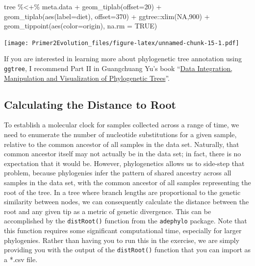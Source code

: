\documentclass[
]{book}
\newenvironment{Shaded}{\begin{snugshade}}{\end{snugshade}}
\newcommand{\AttributeTok}[1]{\textcolor[rgb]{0.77,0.63,0.00}{#1}}
\newcommand{\ConstantTok}[1]{\textcolor[rgb]{0.00,0.00,0.00}{#1}}
\newcommand{\DecValTok}[1]{\textcolor[rgb]{0.00,0.00,0.81}{#1}}
\newcommand{\FunctionTok}[1]{\textcolor[rgb]{0.00,0.00,0.00}{#1}}
\newcommand{\NormalTok}[1]{#1}
\newcommand{\SpecialCharTok}[1]{\textcolor[rgb]{0.00,0.00,0.00}{#1}}
\begin{document}
\begin{Shaded}
\begin{Highlighting}[]
\NormalTok{tree  }\SpecialCharTok{\%\textless{}+\%}\NormalTok{ meta.data }\SpecialCharTok{+} \FunctionTok{geom\_tiplab}\NormalTok{(}\AttributeTok{offset=}\DecValTok{20}\NormalTok{) }\SpecialCharTok{+} \FunctionTok{geom\_tiplab}\NormalTok{(}\FunctionTok{aes}\NormalTok{(}\AttributeTok{label=}\NormalTok{diet), }\AttributeTok{offset=}\DecValTok{370}\NormalTok{) }\SpecialCharTok{+}\NormalTok{ ggtree}\SpecialCharTok{::}\FunctionTok{xlim}\NormalTok{(}\ConstantTok{NA}\NormalTok{,}\DecValTok{900}\NormalTok{) }\SpecialCharTok{+} \FunctionTok{geom\_tippoint}\NormalTok{(}\FunctionTok{aes}\NormalTok{(}\AttributeTok{color=}\NormalTok{origin), }\AttributeTok{na.rm =} \ConstantTok{TRUE}\NormalTok{)}
\end{Highlighting}
\end{Shaded}

\texttt{[image: Primer2Evolution\_files/figure-latex/unnamed-chunk-15-1.pdf]}

If you are interested in learning more about phylogenetic tree annotation using \texttt{ggtree}, I recommend Part II in Guangchuang Yu's book ``\href{https://yulab-smu.top/treedata-book/index.html}{Data Integration, Manipulation and Visualization of Phylogenetic Trees}''.

\hypertarget{calculating-the-distance-to-root}{%
\subsection{Calculating the Distance to Root}\label{calculating-the-distance-to-root}}

To establish a molecular clock for samples collected across a range of time, we need to enumerate the number of nucleotide substitutions for a given sample, relative to the common ancestor of all samples in the data set. Naturally, that common ancestor itself may not actually be in the data set; in fact, there is no expectation that it would be. However, phylogenetics allows us to side-step that problem, because phylogenies infer the pattern of shared ancestry across all samples in the data set, with the common ancestor of all samples representing the root of the tree. In a tree where branch lengths are proportional to the genetic similarity between nodes, we can consequently calculate the distance between the root and any given tip as a metric of genetic divergence. This can be accomplished by the \texttt{distRoot()} function from the \texttt{adephylo} package. Note that this function requires some significant computational time, especially for larger phylogenies. Rather than having you to run this in the exercise, we are simply providing you with the output of the \texttt{distRoot()} function that you can import as a *.csv file.
\end{document}
